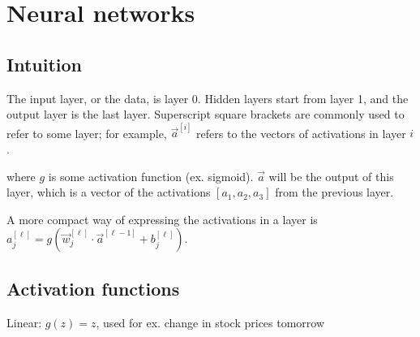 \documentclass[12pt]{article}
\begin{document}
\newcommand*\dif{\mathop{}\!\mathrm{d}}


\newenvironment{subitemize}
{ \begin{itemize}[leftmargin=\parindent] }
{ \end{itemize} }

\newenvironment{subenumerate}
{ \begin{enumerate}[leftmargin=\parindent] }
{ \end{enumerate} }

\newenvironment{nopagebr}
  {\par\nobreak\vfil\penalty0\vfilneg
   \vtop\bgroup}
  {\par\xdef\tpd{\the\prevdepth}\egroup
   \prevdepth=\tpd}

\tableofcontents


\pagebreak

\section{Neural networks}

\subsection{Intuition}

The input layer, or the data, is layer 0. Hidden layers start from layer 1, and the
output layer is the last layer. Superscript square brackets are commonly used
to refer to some layer; for example, $\vec a^{[i]}$ refers to the vectors of
activations in layer $i$.

where $g$ is some activation function (ex. sigmoid). $\vec a$ will be the output of this
layer, which is a vector of the activations $[a_1,a_2,a_3]$ from the previous layer.

A more compact way of expressing the activations in a layer is $a^{[\ell]}_j =
g(\vec w^{[\ell]}_j \cdot \vec a^{[\ell-1]} + b^{[\ell]}_j)$.

\subsection{Activation functions}

Linear: $g(z) = z$, used for ex. change in stock prices tomorrow
\end{document}
